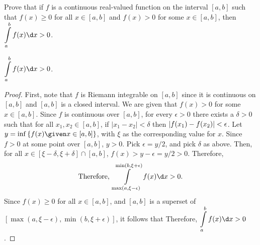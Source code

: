 \begin{problem}
  Prove that if $f$ is a continuous real-valued function on the interval
  $[a, b]$ such that $f(x) \geq 0$ for all $x \in [a, b]$ and
  $f(x) > 0$ for some $x \in [a, b]$, then $\displaystyle \int\limits_a^b f(x) \d x > 0$.
\end{problem}

\begin{answer}
  \begin{claim}
    $\displaystyle \int\limits_a^b f(x) \d x > 0$.
    \begin{proof}
      First, note that $f$ is Riemann integrable on $[a, b]$ since it is continuous
      on $[a, b]$ and $[a, b]$ is a closed interval.
      We are given that $f(x) > 0$ for some $x \in [a, b]$.
      Since $f$ is continuous over $[a, b]$,
      for every $\epsilon > 0$ there exists a $\delta > 0$
      such that for all $x_1, x_2 \in [a, b]$, if $|x_1 - x_2| < \delta$
      then $\lvert f(x_1) - f(x_2)\rvert < \epsilon$.
      Let $y = \inf\set{f(x) \given x \in [a, b]}$, with $\xi$ as the corresponding
      value for $x$. Since $f > 0$ at some point over $[a, b]$, $y > 0$.
      Pick $\epsilon = y/2$, and pick $\delta$ as above.
      Then, for all $x \in [\xi - \delta, \xi + \delta] \cap [a, b]$,
      $f(x) > y - \epsilon = y/2 > 0$.
      Therefore,
      \[ \text{Therefore, }\int\limits_{\max (a, \xi - \epsilon)}^{\min(b, \xi + \epsilon)} f(x) \d x > 0. \]
      Since $f(x) \geq 0$ for all $x \in [a, b]$, and $[a, b]$ is a superset
      of $[\max (a, \xi - \epsilon), \min(b, \xi + \epsilon)]$, it follows that
      Therefore, $\displaystyle \int\limits_a^b f(x) \d x > 0$.
    \end{proof}
  \end{claim}  
\end{answer}
